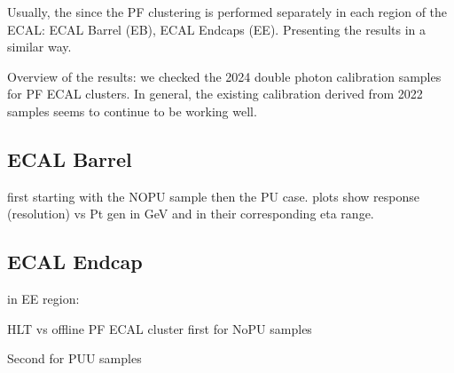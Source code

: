Usually, the since the PF clustering is performed separately in each region of the ECAL: ECAL Barrel (EB), ECAL Endcaps (EE).
Presenting the results in a similar way.

Overview of the results: we checked the 2024 double photon calibration samples for PF ECAL clusters. In general, the existing calibration derived from 2022 samples seems to continue to be working well. 

 
\subsection{ECAL Barrel}
first starting with the NOPU sample then the PU case.
plots show response (resolution) vs Pt gen in GeV and in their corresponding eta range.





\subsection{ECAL Endcap}
in EE region:







HLT vs offline PF ECAL cluster
first for NoPU samples

Second for PUU samples

